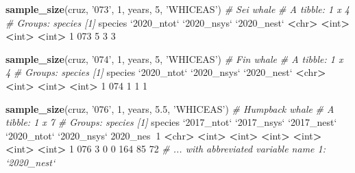 \documentclass[
]{book}
\newenvironment{Shaded}{\begin{snugshade}}{\end{snugshade}}
\newcommand{\CommentTok}[1]{\textcolor[rgb]{0.56,0.35,0.01}{\textit{#1}}}
\newcommand{\DataTypeTok}[1]{\textcolor[rgb]{0.13,0.29,0.53}{#1}}
\newcommand{\DecValTok}[1]{\textcolor[rgb]{0.00,0.00,0.81}{#1}}
\newcommand{\ErrorTok}[1]{\textcolor[rgb]{0.64,0.00,0.00}{\textbf{#1}}}
\newcommand{\FloatTok}[1]{\textcolor[rgb]{0.00,0.00,0.81}{#1}}
\newcommand{\KeywordTok}[1]{\textcolor[rgb]{0.13,0.29,0.53}{\textbf{#1}}}
\newcommand{\NormalTok}[1]{#1}
\newcommand{\OperatorTok}[1]{\textcolor[rgb]{0.81,0.36,0.00}{\textbf{#1}}}
\newcommand{\StringTok}[1]{\textcolor[rgb]{0.31,0.60,0.02}{#1}}
\begin{document}
\begin{Shaded}
\begin{Highlighting}[]
\KeywordTok{sample_size}\NormalTok{(cruz, }\StringTok{'073'}\NormalTok{, }\DecValTok{1}\NormalTok{, years, }\DecValTok{5}\NormalTok{, }\StringTok{'WHICEAS'}\NormalTok{) }\CommentTok{# Sei whale}
\CommentTok{# A tibble: 1 x 4}
\CommentTok{# Groups:   species [1]}
\NormalTok{  species }\StringTok{`}\DataTypeTok{2020_ntot}\StringTok{`} \StringTok{`}\DataTypeTok{2020_nsys}\StringTok{`} \StringTok{`}\DataTypeTok{2020_nest}\StringTok{`}
  \OperatorTok{<}\NormalTok{chr}\OperatorTok{>}\StringTok{         }\ErrorTok{<}\NormalTok{int}\OperatorTok{>}\StringTok{       }\ErrorTok{<}\NormalTok{int}\OperatorTok{>}\StringTok{       }\ErrorTok{<}\NormalTok{int}\OperatorTok{>}
\DecValTok{1} \DecValTok{073}               \DecValTok{5}           \DecValTok{3}           \DecValTok{3}

\KeywordTok{sample_size}\NormalTok{(cruz, }\StringTok{'074'}\NormalTok{, }\DecValTok{1}\NormalTok{, years, }\DecValTok{5}\NormalTok{, }\StringTok{'WHICEAS'}\NormalTok{) }\CommentTok{# Fin whale}
\CommentTok{# A tibble: 1 x 4}
\CommentTok{# Groups:   species [1]}
\NormalTok{  species }\StringTok{`}\DataTypeTok{2020_ntot}\StringTok{`} \StringTok{`}\DataTypeTok{2020_nsys}\StringTok{`} \StringTok{`}\DataTypeTok{2020_nest}\StringTok{`}
  \OperatorTok{<}\NormalTok{chr}\OperatorTok{>}\StringTok{         }\ErrorTok{<}\NormalTok{int}\OperatorTok{>}\StringTok{       }\ErrorTok{<}\NormalTok{int}\OperatorTok{>}\StringTok{       }\ErrorTok{<}\NormalTok{int}\OperatorTok{>}
\DecValTok{1} \DecValTok{074}               \DecValTok{1}           \DecValTok{1}           \DecValTok{1}

\KeywordTok{sample_size}\NormalTok{(cruz, }\StringTok{'076'}\NormalTok{, }\DecValTok{1}\NormalTok{, years, }\FloatTok{5.5}\NormalTok{, }\StringTok{'WHICEAS'}\NormalTok{) }\CommentTok{# Humpback whale}
\CommentTok{# A tibble: 1 x 7}
\CommentTok{# Groups:   species [1]}
\NormalTok{  species }\StringTok{`}\DataTypeTok{2017_ntot}\StringTok{`} \StringTok{`}\DataTypeTok{2017_nsys}\StringTok{`} \StringTok{`}\DataTypeTok{2017_nest}\StringTok{`} \StringTok{`}\DataTypeTok{2020_ntot}\StringTok{`} \StringTok{`}\DataTypeTok{2020_nsys}\StringTok{`} \DecValTok{2020}\NormalTok{_nes}\OperatorTok{~}\DecValTok{1}
  \OperatorTok{<}\NormalTok{chr}\OperatorTok{>}\StringTok{         }\ErrorTok{<}\NormalTok{int}\OperatorTok{>}\StringTok{       }\ErrorTok{<}\NormalTok{int}\OperatorTok{>}\StringTok{       }\ErrorTok{<}\NormalTok{int}\OperatorTok{>}\StringTok{       }\ErrorTok{<}\NormalTok{int}\OperatorTok{>}\StringTok{       }\ErrorTok{<}\NormalTok{int}\OperatorTok{>}\StringTok{      }\ErrorTok{<}\NormalTok{int}\OperatorTok{>}
\DecValTok{1} \DecValTok{076}               \DecValTok{3}           \DecValTok{0}           \DecValTok{0}         \DecValTok{164}          \DecValTok{85}         \DecValTok{72}
\CommentTok{# ... with abbreviated variable name 1: `2020_nest`}


\end{Highlighting}
\end{Shaded}
\end{document}
